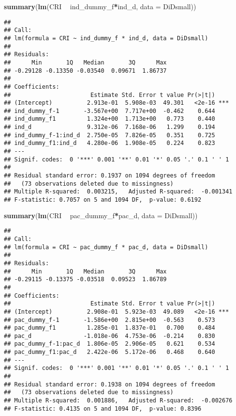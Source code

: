 \documentclass[]{article}
\newenvironment{Shaded}{\begin{snugshade}}{\end{snugshade}}
\newcommand{\KeywordTok}[1]{\textcolor[rgb]{0.13,0.29,0.53}{\textbf{#1}}}
\newcommand{\DataTypeTok}[1]{\textcolor[rgb]{0.13,0.29,0.53}{#1}}
\newcommand{\StringTok}[1]{\textcolor[rgb]{0.31,0.60,0.02}{#1}}
\newcommand{\OperatorTok}[1]{\textcolor[rgb]{0.81,0.36,0.00}{\textbf{#1}}}
\newcommand{\NormalTok}[1]{#1}
\begin{document}
\begin{Shaded}
\begin{Highlighting}[]
\KeywordTok{summary}\NormalTok{(}\KeywordTok{lm}\NormalTok{(CRI }\OperatorTok{~}\StringTok{ }\NormalTok{ind_dummy_f}\OperatorTok{*}\NormalTok{ind_d, }\DataTypeTok{data =}\NormalTok{ DiDsmall))}
\end{Highlighting}
\end{Shaded}

\begin{verbatim}
## 
## Call:
## lm(formula = CRI ~ ind_dummy_f * ind_d, data = DiDsmall)
## 
## Residuals:
##      Min       1Q   Median       3Q      Max 
## -0.29128 -0.13350 -0.03540  0.09671  1.86737 
## 
## Coefficients:
##                       Estimate Std. Error t value Pr(>|t|)    
## (Intercept)          2.913e-01  5.908e-03  49.301   <2e-16 ***
## ind_dummy_f-1       -3.567e+00  7.717e+00  -0.462    0.644    
## ind_dummy_f1         1.324e+00  1.713e+00   0.773    0.440    
## ind_d                9.312e-06  7.168e-06   1.299    0.194    
## ind_dummy_f-1:ind_d  2.750e-05  7.826e-05   0.351    0.725    
## ind_dummy_f1:ind_d   4.280e-06  1.908e-05   0.224    0.823    
## ---
## Signif. codes:  0 '***' 0.001 '**' 0.01 '*' 0.05 '.' 0.1 ' ' 1
## 
## Residual standard error: 0.1937 on 1094 degrees of freedom
##   (73 observations deleted due to missingness)
## Multiple R-squared:  0.003215,   Adjusted R-squared:  -0.001341 
## F-statistic: 0.7057 on 5 and 1094 DF,  p-value: 0.6192
\end{verbatim}

\begin{Shaded}
\begin{Highlighting}[]
\KeywordTok{summary}\NormalTok{(}\KeywordTok{lm}\NormalTok{(CRI }\OperatorTok{~}\StringTok{ }\NormalTok{pac_dummy_f}\OperatorTok{*}\NormalTok{pac_d, }\DataTypeTok{data =}\NormalTok{ DiDsmall))}
\end{Highlighting}
\end{Shaded}

\begin{verbatim}
## 
## Call:
## lm(formula = CRI ~ pac_dummy_f * pac_d, data = DiDsmall)
## 
## Residuals:
##      Min       1Q   Median       3Q      Max 
## -0.29115 -0.13375 -0.03518  0.09523  1.86789 
## 
## Coefficients:
##                       Estimate Std. Error t value Pr(>|t|)    
## (Intercept)          2.908e-01  5.923e-03  49.089   <2e-16 ***
## pac_dummy_f-1       -1.586e+00  2.815e+00  -0.563    0.573    
## pac_dummy_f1         1.285e-01  1.837e-01   0.700    0.484    
## pac_d               -1.018e-06  4.753e-06  -0.214    0.830    
## pac_dummy_f-1:pac_d  1.806e-05  2.906e-05   0.621    0.534    
## pac_dummy_f1:pac_d   2.422e-06  5.172e-06   0.468    0.640    
## ---
## Signif. codes:  0 '***' 0.001 '**' 0.01 '*' 0.05 '.' 0.1 ' ' 1
## 
## Residual standard error: 0.1938 on 1094 degrees of freedom
##   (73 observations deleted due to missingness)
## Multiple R-squared:  0.001886,   Adjusted R-squared:  -0.002676 
## F-statistic: 0.4135 on 5 and 1094 DF,  p-value: 0.8396
\end{verbatim}
\end{document}
